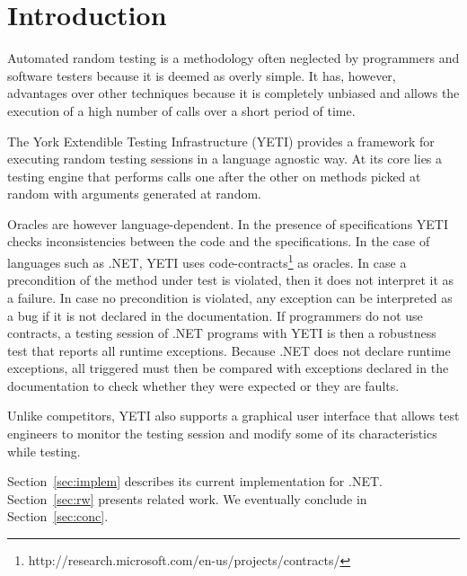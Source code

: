 \section{Introduction}\label{sec:intro}

Automated random testing is a methodology often neglected by 
programmers and software testers because it is deemed as overly
simple. It has, however, advantages over other techniques because 
it is completely unbiased and allows the execution of a high number 
of calls over a short period of time.


The York Extendible Testing Infrastructure (YETI) provides a framework 
for executing random testing sessions in a language agnostic way. At its core lies a testing engine that performs 
calls one after the other on methods picked at random with arguments generated at random.
%

Oracles are however language-dependent. In the presence of specifications YETI checks 
inconsistencies between the code and the specifications. In the case of 
languages such as .NET, YETI uses code-contracts\footnote{http://research.microsoft.com/en-us/projects/contracts/} as oracles.
In case a precondition of the method under test is violated, then it 
does not interpret it as a failure. In case no precondition is violated, any 
exception can be interpreted as a bug if it is not declared in the documentation. 
If programmers do not use contracts, a testing session of .NET programs with YETI 
is then a robustness test that reports all runtime exceptions. Because .NET does 
not declare runtime exceptions, all triggered must then be compared with exceptions 
declared in the documentation to check whether they were expected or they are faults.
 

Unlike competitors, YETI also supports a graphical user interface that 
allows test engineers to monitor the testing session and modify some 
of its characteristics while testing. 

Section~\ref{sec:implem} describes its current implementation for .NET.
Section~\ref{sec:rw} presents related work.
We eventually conclude in Section~\ref{sec:conc}.
